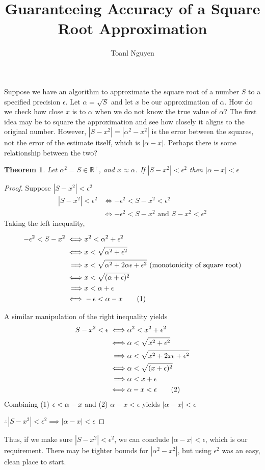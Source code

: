 \documentclass{article}
\newtheorem{theorem}{Theorem}
\newcommand\numberthis{\addtocounter{equation}{1}\tag{\theequation}}
\begin{document}
\title{Guaranteeing Accuracy of a Square Root Approximation}
\author{Toanl Nguyen}
\maketitle
Suppose we have an algorithm to approximate the square root of a number $S$ to a specified precision $\epsilon$. Let $\alpha = \sqrt{S}$ and let $x$ be our approximation of $\alpha$. How do we check how close $x$ is to $\alpha$ when we do not know the true value of $\alpha$? The first idea may be to square the approximation and see how closely it aligns to the original number. However, $|S-x^2| = |\alpha^2 - x^2|$ is the error between the squares, not the error of the estimate itself, which is $|\alpha - x|$. Perhaps there is some relationship between the two?

\begin{theorem}
Let $\alpha^2=S \in \mathbb{R^+}$, and $x \approx \alpha$. If $|S-x^2| < \epsilon^2$ then $|\alpha-x|<\epsilon$
\end{theorem}

\begin{proof}
Suppose $|S-x^2| < \epsilon^2$
\begin{align*}
|S-x^2| < \epsilon^2 &\iff -\epsilon^2 < S-x^2<\epsilon^2\\
                  &\iff -\epsilon^2 < S-x^2 \mbox{ and } S-x^2<\epsilon^2
\end{align*}
Taking the left inequality,

\begin{align*}
-\epsilon^2 < S-x^2 \iff& x^2 < \alpha^2 + \epsilon^2\\
\iff& x < \sqrt{\alpha^2 + \epsilon^2}\\
\implies& x < \sqrt{\alpha^2 + 2\alpha\epsilon + \epsilon^2} \mbox{  (monotonicity of square root)}\\
\iff& x < \sqrt{(\alpha + \epsilon)^2}\\
\implies& x < \alpha + \epsilon\\
\iff& -\epsilon < \alpha - x \numberthis
\end{align*}

A similar manipulation of the right inequality yields
\begin{align*}
S-x^2 < \epsilon \iff& \alpha^2 < x^2 + \epsilon^2\\
\iff& \alpha < \sqrt{x^2 + \epsilon^2}\\
\implies& \alpha < \sqrt{x^2 + 2x\epsilon + \epsilon^2}\\
\iff& \alpha < \sqrt{(x + \epsilon)^2}\\
\implies& \alpha < x + \epsilon\\
\iff& \alpha - x < \epsilon \numberthis
\end{align*}
Combining (1) $\-\epsilon < \alpha - x$ and (2) $\alpha - x < \epsilon$ yields
$|\alpha - x| < \epsilon$

$\therefore |S - x^2| < \epsilon^2 \implies |\alpha - x | < \epsilon$
\end{proof}
Thus, if we make sure $|S-x^2| < \epsilon^2$, we can conclude $|\alpha - x| < \epsilon$, which is our requirement. There may be tighter bounds for $|\alpha^2 - x^2|$, but using $\epsilon^2$ was an easy, clean place to start.
\end{document}
